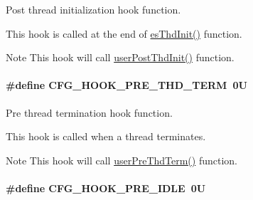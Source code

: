 Post thread initialization hook function. 

This hook is called at the end of \hyperlink{group__kern__intf_gac91734f3ee867b519f59bf81cc7fde88}{es\-Thd\-Init()} function. \begin{DoxyNote}{Note}
This hook will call \hyperlink{group__kern__intf_ga64ca864d0ff2aaa532208d7c2b88bdb3}{user\-Post\-Thd\-Init()} function. 
\end{DoxyNote}
\hypertarget{group__template__kern__cfg_ga9c7dd4e009a89e9cffb0f9b404bc6250}{
\paragraph[{C\-F\-G\-\_\-\-H\-O\-O\-K\-\_\-\-P\-R\-E\-\_\-\-T\-H\-D\-\_\-\-T\-E\-R\-M}]{\setlength{\rightskip}{0pt plus 5cm}\#define C\-F\-G\-\_\-\-H\-O\-O\-K\-\_\-\-P\-R\-E\-\_\-\-T\-H\-D\-\_\-\-T\-E\-R\-M~0\-U}}\label{group__template__kern__cfg_ga9c7dd4e009a89e9cffb0f9b404bc6250}


Pre thread termination hook function. 

This hook is called when a thread terminates. \begin{DoxyNote}{Note}
This hook will call \hyperlink{group__kern__intf_ga076ad76633999c9d5e245e3b5c6e0c09}{user\-Pre\-Thd\-Term()} function. 
\end{DoxyNote}
\hypertarget{group__template__kern__cfg_ga7c2b0410404256c4804758090401f7e4}{
\paragraph[{C\-F\-G\-\_\-\-H\-O\-O\-K\-\_\-\-P\-R\-E\-\_\-\-I\-D\-L\-E}]{\setlength{\rightskip}{0pt plus 5cm}\#define C\-F\-G\-\_\-\-H\-O\-O\-K\-\_\-\-P\-R\-E\-\_\-\-I\-D\-L\-E~0\-U}}\label{group__template__kern__cfg_ga7c2b0410404256c4804758090401f7e4}


